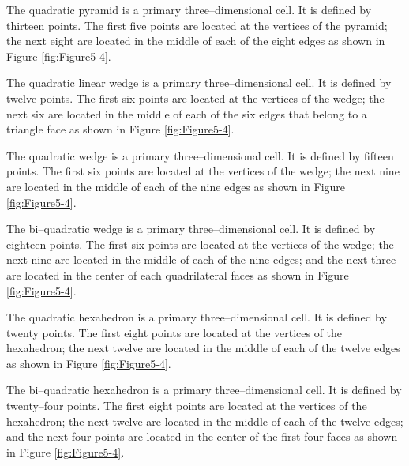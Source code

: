 \begin{description}[leftmargin=0cm,labelindent=0cm]
\item[Quadratic Pyramid.\index{cell!quadratic pyramid}\index{quadratic pyramid}] The quadratic pyramid is a primary three--dimensional cell. It is defined by thirteen points. The first five points are located at the vertices of the pyramid; the next eight are located in the middle of each of the eight edges as shown in Figure \ref{fig:Figure5-4}.

\item[Quadratic Linear Wedge.\index{cell!quadratic linear wedge}\index{quadratic linear wedge}] The quadratic linear wedge is a primary three--dimensional cell. It is defined by twelve points. The first six points are located at the vertices of the wedge; the next six are located in the middle of each of the six edges that belong to a triangle face as shown in Figure \ref{fig:Figure5-4}.

\item[Quadratic Wedge.\index{cell!quadratic wedge}\index{quadratic wedge}] The quadratic wedge is a primary three--dimensional cell. It is defined by fifteen points. The first six points are located at the vertices of the wedge; the next nine are located in the middle of each of the nine edges as shown in Figure \ref{fig:Figure5-4}.

\item[Bi--Quadratic Wedge.\index{bi-quadratic wedge}\index{cell!bi-quadratic wedge}] The bi--quadratic wedge is a primary three--dimensional cell. It is defined by eighteen points. The first six points are located at the vertices of the wedge; the next nine are located in the middle of each of the nine edges; and the next three are located in the center of each quadrilateral faces as shown in Figure \ref{fig:Figure5-4}.

\item[Quadratic Hexahedron.\index{cell!quadratic hexahedron}\index{quadratic hexahedron}] The quadratic hexahedron is a primary three--dimensional cell. It is defined by twenty points. The first eight points are located at the vertices of the hexahedron; the next twelve are located in the middle of each of the twelve edges as shown in Figure \ref{fig:Figure5-4}.

\item[Bi--Quadratic Hexahedron.\index{bi-quadratic hexahedron}\index{cell!bi-quadratic hexahedron}] The bi--quadratic hexahedron is a primary three--dimensional cell. It is defined by twenty--four points. The first eight points are located at the vertices of the hexahedron; the next twelve are located in the middle of each of the twelve edges; and the next four points are located in the center of the first four faces as shown in Figure \ref{fig:Figure5-4}.


\end{description}

